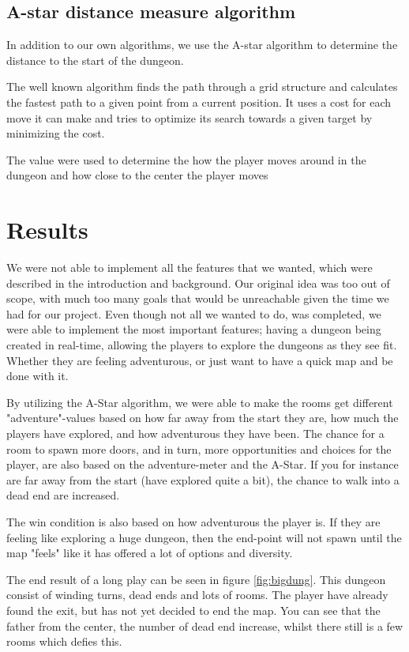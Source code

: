 \documentclass[conference,compsoc]{IEEEtran}
\begin{document}
\subsection{A-star distance measure algorithm}
\label{sec:astar}
In addition to our own algorithms, we use the A-star\cite{Astar} algorithm to determine the distance to the start of the dungeon. 

The well known algorithm finds the path through a grid structure and calculates the fastest path to a given point from a current position. It uses a cost for each move it can make and tries to optimize its search towards a given target by minimizing the cost.

The value were used to determine the how the player moves around in the dungeon and how close to the center the player moves

\section{Results}
We were not able to implement all the features that we wanted, which were described in the introduction and background. Our original idea was too out of scope, with much too many goals that would be unreachable given the time we had for our project. Even though not all we wanted to do, was completed, we were able to implement the most important features; having a dungeon being created in real-time, allowing the players to explore the dungeons as they see fit. Whether they are feeling adventurous, or just want to have a quick map and be done with it. 

By utilizing the A-Star algorithm, we were able to make the rooms get different "adventure"-values based on how far away from the start they are, how much the players have explored, and how adventurous they have been. The chance for a room to spawn more doors, and in turn, more opportunities and choices for the player, are also based on the adventure-meter and the A-Star. If you for instance are far away from the start (have explored quite a bit), the chance to walk into a dead end are increased.

The win condition is also based on how adventurous the player is. If they are feeling like exploring a huge dungeon, then the end-point will not spawn until the map "feels" like it has offered a lot of options and diversity.

The end result of a long play can be seen in figure \ref{fig:bigdung}. This dungeon consist of winding turns, dead ends and lots of rooms. The player have already found the exit, but has not yet decided to end the map. You can see that the father from the center, the number of dead end increase, whilst there still is a few rooms which defies this. 
\end{document}
